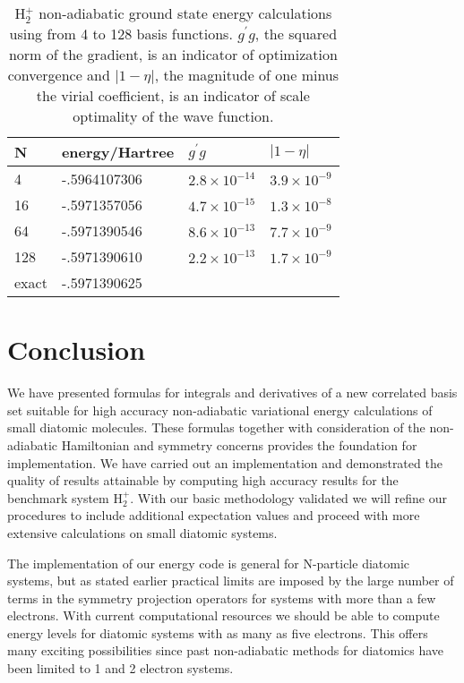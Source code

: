 \documentclass[12pt]{article}
\begin{document}
\begin{table}[p] \centering
\begin{tabular}
[c]{llll}\hline\hline
N & energy/Hartree & $g^{\prime}g$ & $\left|  1-\eta\right|  $\\\hline
4 & -.5964107306 & $2.8\times10^{-14}$ & $3.9\times10^{-9}$\\
16 & -.5971357056 & $4.7\times10^{-15}$ & $1.3\times10^{-8}$\\
64 & -.5971390546 & $8.6\times10^{-13}$ & $7.7\times10^{-9}$\\
128 & -.5971390610 & $2.2\times10^{-13}$ & $1.7\times10^{-9}$\\
exact\cite{Bishop77} & -.5971390625 &  & \\\hline\hline
\end{tabular}
\caption{
H$_{2}^{+}%
$  non-adiabatic ground state energy calculations using from 4 to 128 basis functions.
$g^{\prime}%
g$, the squared norm of the gradient, is an indicator of optimization convergence and
$\left| 1-\eta\right
| $, the magnitude of one minus the virial coefficient, is an indicator of scale optimality
of the wave function.
\label{H2pRes}}%
\end{table}%

\section{Conclusion}

We have presented formulas for integrals and derivatives of a new correlated
basis set suitable for high accuracy non-adiabatic variational energy
calculations of small diatomic molecules. These formulas together with
consideration of the non-adiabatic Hamiltonian and symmetry concerns provides
the foundation for implementation. We have carried out an implementation and
demonstrated the quality of results attainable by computing high accuracy
results for the benchmark system H$_{2}^{+}$. With our basic methodology
validated we will refine our procedures to include additional expectation
values and proceed with more extensive calculations on small diatomic systems.

The implementation of our energy code is general for N-particle diatomic
systems, but as stated earlier practical limits are imposed by the large
number of terms in the symmetry projection operators for systems with more
than a few electrons. With current computational resources we should be able
to compute energy levels for diatomic systems with as many as five electrons.
This offers many exciting possibilities since past non-adiabatic methods for
diatomics have been limited to 1 and 2 electron systems.
\end{document}
